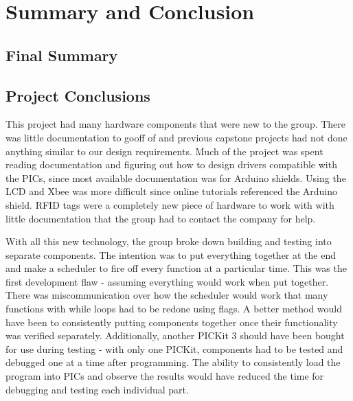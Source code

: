 \documentclass[12pt]{article} %
\begin{document}
\section{Summary and Conclusion}
%

\subsection{Final Summary}


\subsection{Project Conclusions} %

This project had many hardware components that were new to the group. There was little documentation to gooff of and previous capstone projects had not done anything similar to our design requirements. Much of the project was spent reading documentation and figuring out how to design drivers compatible with the PICs, since most available documentation was for Arduino shields. Using the LCD and Xbee was more difficult since online tutorials referenced the Arduino shield. RFID tags were a completely new piece of hardware to work with with little documentation that the group had to contact the company for help.

With all this new technology, the group broke down building and testing into separate components. The intention was to put everything together at the end and make a scheduler to fire off every function at a particular time. This was the first development flaw - assuming everything would work when put together. There was miscommunication over how the scheduler would work that many functions with while loops had to be redone using flags. A better method would have been to consistently putting components together once their functionality was verified separately. Additionally, another PICKit 3 should have been bought for use during testing - with only one PICKit, components had to be tested and debugged one at a time after programming. The ability to consistently load the program into PICs and observe the results would have reduced the time for debugging and testing each individual part.
\end{document}
